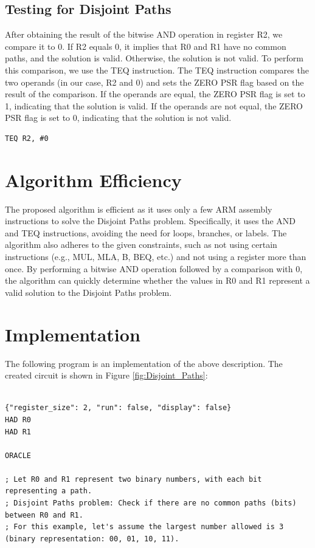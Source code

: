 \begin{thebibliography}{99}
\subsection{Testing for Disjoint Paths}
After obtaining the result of the bitwise AND operation in register R2, we compare it to 0. If R2 equals 0, it implies that R0 and R1 have no common paths, and the solution is valid. Otherwise, the solution is not valid. To perform this comparison, we use the TEQ instruction. The TEQ instruction compares the two operands (in our case, R2 and 0) and sets the ZERO PSR flag based on the result of the comparison. If the operands are equal, the ZERO PSR flag is set to 1, indicating that the solution is valid. If the operands are not equal, the ZERO PSR flag is set to 0, indicating that the solution is not valid.

\begin{verbatim}
TEQ R2, #0
\end{verbatim}

\section{Algorithm Efficiency}
The proposed algorithm is efficient as it uses only a few ARM assembly instructions to solve the Disjoint Paths problem. Specifically, it uses the AND and TEQ instructions, avoiding the need for loops, branches, or labels. The algorithm also adheres to the given constraints, such as not using certain instructions (e.g., MUL, MLA, B, BEQ, etc.) and not using a register more than once. By performing a bitwise AND operation followed by a comparison with 0, the algorithm can quickly determine whether the values in R0 and R1 represent a valid solution to the Disjoint Paths problem.



\section{Implementation}

The following program is an implementation of the above description. The created circuit is shown in Figure \ref{fig:Disjoint_Paths}:

\begin{lstlisting}

{"register_size": 2, "run": false, "display": false}
HAD R0
HAD R1

ORACLE

; Let R0 and R1 represent two binary numbers, with each bit representing a path.
; Disjoint Paths problem: Check if there are no common paths (bits) between R0 and R1.
; For this example, let's assume the largest number allowed is 3 (binary representation: 00, 01, 10, 11).


\end{lstlisting}
\end{thebibliography}
